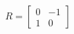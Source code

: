 \documentclass[preview]{standalone}
\begin{document}
\begin{align*}
R=\begin{bmatrix}0&-1\\1&0\end{bmatrix}
\end{align*}
\end{document}
